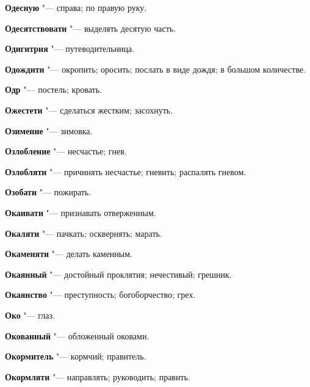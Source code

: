\begin{mymulticols}{2}
\noindent\textbf{Одесную} "--- справа; по правую руку. 




\noindent\textbf{Одесятствовати} "--- выделять десятую часть. 




\noindent\textbf{Одигитрия} "--- путеводительница. 




\noindent\textbf{Одождити} "--- окропить; оросить; послать в виде дождя; в большом количестве. 




\noindent\textbf{Одр} "--- постель; кровать. 




\noindent\textbf{Ожестети} "--- сделаться жестким; засохнуть. 




\noindent\textbf{Озимение} "--- зимовка. 




\noindent\textbf{Озлобление} "--- несчастье; гнев. 




\noindent\textbf{Озлобляти} "--- причинять несчастье; гневить; распалять гневом. 




\noindent\textbf{Озобати} "--- пожирать. 




\noindent\textbf{Окаивати} "--- признавать отверженным. 




\noindent\textbf{Окаляти} "--- пачкать; осквернять; марать. 




\noindent\textbf{Окаменяти} "--- делать каменным. 




\noindent\textbf{Окаянный} "--- достойный проклятия; нечестивый; грешник. 




\noindent\textbf{Окаянство} "--- преступность; богоборчество; грех. 




\noindent\textbf{Око} "--- глаз. 




\noindent\textbf{Окованный} "--- обложенный оковами. 




\noindent\textbf{Окормитель} "--- кормчий; правитель. 




\noindent\textbf{Окормляти} "--- направлять; руководить; править. 





\end{mymulticols}
